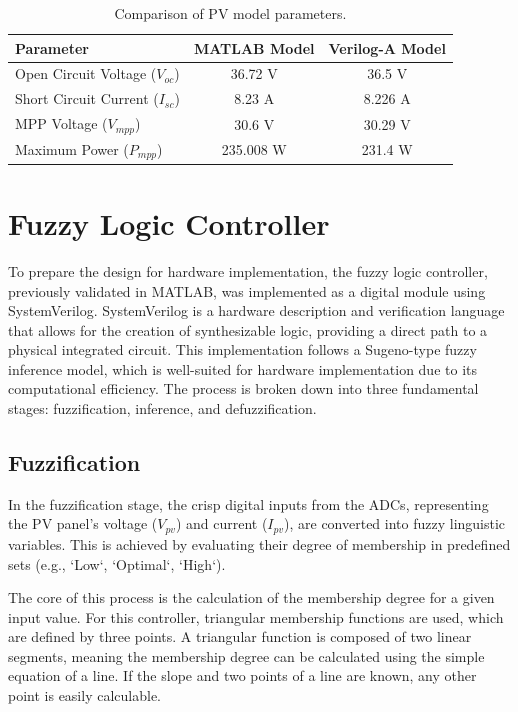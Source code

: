 \documentclass[a4paper,oneside,12pt]{report}
\numberwithin{equation}{chapter}
\begin{document}
\begin{table}[H]
    \centering
    \caption{Comparison of PV model parameters.}\label{tab:pv_model_comparison}
    \vspace{0.5\baselineskip}
    \begin{tabular}{|l|c|c|}
        \hline
        Parameter & MATLAB Model & Verilog-A Model \\
        \hline
        Open Circuit Voltage ($V_{oc}$) & 36.72 V & 36.5 V \\
        \hline
        Short Circuit Current ($I_{sc}$) & 8.23 A & 8.226 A \\
        \hline
        MPP Voltage ($V_{mpp}$) & 30.6 V & 30.29 V \\
        \hline
        Maximum Power ($P_{mpp}$) & 235.008 W & 231.4 W \\
        \hline
    \end{tabular}
\end{table}

\section{Fuzzy Logic Controller}\label{sec:sv_fuzzy_engine}
To prepare the design for hardware implementation, the fuzzy logic controller, previously validated in MATLAB, was implemented as a digital module using SystemVerilog. SystemVerilog is a hardware description and verification language that allows for the creation of synthesizable logic, providing a direct path to a physical integrated circuit. This implementation follows a Sugeno-type fuzzy inference model, which is well-suited for hardware implementation due to its computational efficiency. The process is broken down into three fundamental stages: fuzzification, inference, and defuzzification.

\subsection{Fuzzification}\label{sec:sv_fuzzification}
In the fuzzification stage, the crisp digital inputs from the ADCs, representing the PV panel's voltage ($V_{pv}$) and current ($I_{pv}$), are converted into fuzzy linguistic variables. This is achieved by evaluating their degree of membership in predefined sets (e.g., `Low`, `Optimal`, `High`).

The core of this process is the calculation of the membership degree for a given input value. For this controller, triangular membership functions are used, which are defined by three points. A triangular function is composed of two linear segments, meaning the membership degree can be calculated using the simple equation of a line. If the slope and two points of a line are known, any other point is easily calculable.
\end{document}
